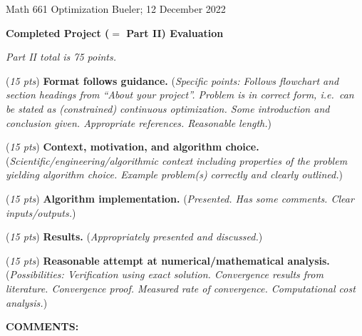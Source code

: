 \documentclass[12pt]{amsart}
\begin{document}
\scriptsize \noindent Math 661 Optimization \hfill  Bueler; 12 December 2022
\normalsize\bigskip

\thispagestyle{empty}
\noindent\large\centerline{\textbf{Completed Project ($=$ Part II) Evaluation}} \normalsize

\medskip
\noindent\centerline{\emph{Part II total is 75 points.}}

\bigskip\bigskip

\noindent (\emph{15 pts}) \textbf{Format follows guidance.} (\emph{Specific points:  Follows flowchart and section headings from ``About your project''.  Problem is in correct form, i.e.~can be stated as (constrained) continuous optimization.  Some introduction and conclusion given.  Appropriate references.  Reasonable length.})
\vspace{0.6in}

\noindent (\emph{15 pts}) \textbf{Context, motivation, and algorithm choice.}  (\emph{Scientific/engineering/algorithmic context including properties of the problem yielding algorithm choice.  Example problem(s) correctly and clearly outlined.})
\vspace{0.6in}

\noindent (\emph{15 pts}) \textbf{Algorithm implementation.}  (\emph{Presented.  Has some comments.  Clear inputs/outputs.})
\vspace{0.6in}

\noindent (\emph{15 pts}) \textbf{Results.}  (\emph{Appropriately presented and discussed.})
\vspace{0.6in}

\noindent (\emph{15 pts}) \textbf{Reasonable attempt at numerical/mathematical analysis.}  (\emph{Possibilities:  Verification using exact solution.  Convergence results from literature.  Convergence proof.  Measured rate of convergence.  Computational cost analysis.})
\vspace{0.8in}


\noindent \textbf{COMMENTS:}
\vfill
\end{document}
